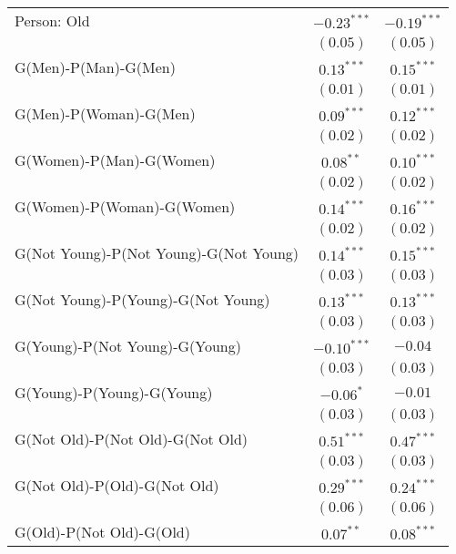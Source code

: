 \begin{center}
\begin{longtable}{l c c}
Person: Old                            & $-0.23^{***}$ & $-0.19^{***}$ \\
                                       & $(0.05)$      & $(0.05)$      \\
G(Men)-P(Man)-G(Men)                   & $0.13^{***}$  & $0.15^{***}$  \\
                                       & $(0.01)$      & $(0.01)$      \\
G(Men)-P(Woman)-G(Men)                 & $0.09^{***}$  & $0.12^{***}$  \\
                                       & $(0.02)$      & $(0.02)$      \\
G(Women)-P(Man)-G(Women)               & $0.08^{**}$   & $0.10^{***}$  \\
                                       & $(0.02)$      & $(0.02)$      \\
G(Women)-P(Woman)-G(Women)             & $0.14^{***}$  & $0.16^{***}$  \\
                                       & $(0.02)$      & $(0.02)$      \\
G(Not Young)-P(Not Young)-G(Not Young) & $0.14^{***}$  & $0.15^{***}$  \\
                                       & $(0.03)$      & $(0.03)$      \\
G(Not Young)-P(Young)-G(Not Young)     & $0.13^{***}$  & $0.13^{***}$  \\
                                       & $(0.03)$      & $(0.03)$      \\
G(Young)-P(Not Young)-G(Young)         & $-0.10^{***}$ & $-0.04$       \\
                                       & $(0.03)$      & $(0.03)$      \\
G(Young)-P(Young)-G(Young)             & $-0.06^{*}$   & $-0.01$       \\
                                       & $(0.03)$      & $(0.03)$      \\
G(Not Old)-P(Not Old)-G(Not Old)       & $0.51^{***}$  & $0.47^{***}$  \\
                                       & $(0.03)$      & $(0.03)$      \\
G(Not Old)-P(Old)-G(Not Old)           & $0.29^{***}$  & $0.24^{***}$  \\
                                       & $(0.06)$      & $(0.06)$      \\
G(Old)-P(Not Old)-G(Old)               & $0.07^{**}$   & $0.08^{***}$  \\

\end{longtable}
\end{center}
